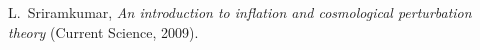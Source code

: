 \documentclass[12pt,a4paper,oneside]{book}
\begin{document}
\begin{thebibliography}{99}
L.~Sriramkumar, {\sl An introduction to inflation and cosmological perturbation theory}\/ (Current Science, 2009).
\end{thebibliography}

\end{document}
